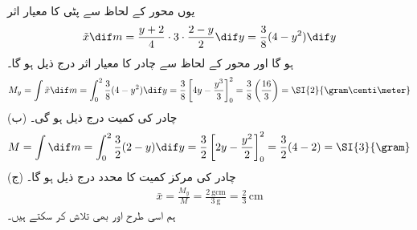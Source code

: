 یوں محور  کے لحاظ سے پٹی کا معیار اثر
\begin{align*}
\tilde{x}\dif m=\frac{y+2}{4}\cdot 3\cdot \frac{2-y}{2}\dif y=\frac{3}{8}(4-y^2)\dif y
\end{align*}
ہو گا اور محور  کے لحاظ سے چادر کا معیار اثر درج ذیل ہو گا۔
\begin{align*}
M_y=\int\tilde{x}\dif m=\int_0^2\frac{3}{8}(4-y^2)\dif y=\frac{3}{8}\left[4y-\frac{y^3}{3}\right]_0^2=\frac{3}{8}\left(\frac{16}{3}\right)=\SI{2}{\gram\centi\meter}
\end{align*}
(ب) چادر کی کمیت درج ذیل ہو گی۔
\begin{align*}
M=\int\dif m=\int_0^2\frac{3}{2}(2-y)\dif y=\frac{3}{2}\left[2y-\frac{y^2}{2}\right]_0^2=\frac{3}{2}(4-2)=\SI{3}{\gram}
\end{align*}
(ج) چادر کی مرکز کمیت کا  محدد درج ذیل ہو گا۔
\begin{align*}
\bar{x}=\frac{M_y}{M}=\frac{\SI{2}{\gram\centi\meter}}{\SI{3}{\gram}}=\frac{2}{3}\,\si{\centi\meter}
\end{align*}
ہم اسی طرح  اور  بھی تلاش کر سکتے ہیں۔
